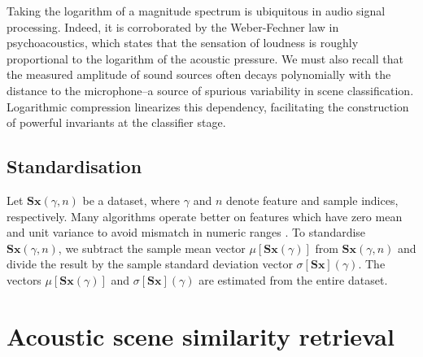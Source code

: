 \documentclass[smallextended]{svjour3}
\begin{document}
Taking the logarithm of a magnitude spectrum is ubiquitous in audio signal processing.
Indeed, it is corroborated by the Weber-Fechner law in psychoacoustics, which states that the sensation of loudness is roughly proportional to the logarithm of the acoustic pressure.
We must also recall that the measured amplitude of sound sources often decays polynomially with the distance to the microphone--a source of spurious variability in scene classification.
Logarithmic compression linearizes this dependency, facilitating the construction of powerful invariants at the classifier stage.

\subsection{Standardisation}
\label{sec:stand}

Let $\mathbf{S}\boldsymbol{x}(\gamma,n)$ be a dataset, where $\gamma$ and $n$ denote feature and sample indices, respectively.
Many algorithms operate better on features which have zero mean and unit variance to avoid mismatch in numeric ranges \cite{Hsu2003}.
To standardise $\mathbf{S}\boldsymbol{x}(\gamma,n)$, we subtract the sample mean vector $\mu[\mathbf{S}\boldsymbol{x}(\gamma)]$ from $\mathbf{S}\boldsymbol{x}(\gamma,n)$ and divide the result by the sample standard deviation vector $\sigma[\mathbf{S}\boldsymbol{x}] (\gamma)$.
The vectors $\mu[\mathbf{S}\boldsymbol{x}(\gamma)]$ and $\sigma[\mathbf{S}\boldsymbol{x}](\gamma)$ are estimated from the entire dataset.

\section{Acoustic scene similarity retrieval}
\label{sec:object}


\end{document}

